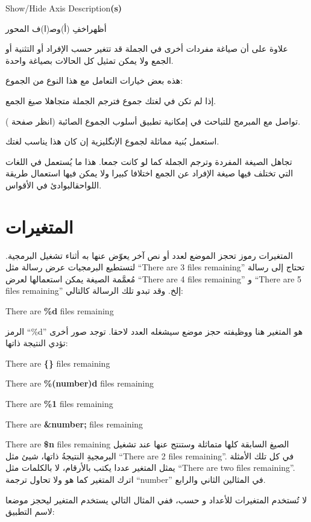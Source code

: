 Show/Hide Axis Description{\bf (s)}

أظهر اخفِ (أ)وص‍(ا)ف المحور

علاوة على أن صياغة مفردات أخرى في الجملة قد تتغير حسب الإفراد أو التثنية
أو الجمع ولا يمكن تمثيل كل الحالات بصياغة واحدة.

هذه بعض خيارات التعامل مع هذا النوع من الجموع:

\startitemize[n]
\item إذا لم تكن في لغتك جموع فترجم الجملة متجاهلا صيغ الجمع.
\item تواصل مع المبرمج للتباحث في إمكانية تطبيق أسلوب الجموع الصائبة
(انظر صفحة \at[ref:33482409]).
\item استعمل بُنية مماثلة لجموع الإنگليزية إن كان هذا يناسب لغتك.
\item تجاهل الصيغة المفردة وترجم الجملة كما لو كانت جمعا. هذا ما يُستعمل
في اللغات التي تختلف فيها صيغة الإفراد عن الجمع اختلافا كبيرا ولا يمكن
فيها استعمال طريقة اللواحق البوادئ في الأقواس.
\stopitemize
\section[ref:33556809]{المتغيرات}
المتغيرات رموز تحجز الموضع لعدد أو
نص آخر يعوّض عنها به أثناء تشغيل البرمجية. لتستطيع البرمجيات عرض رسالة
مثل “There are 3 files remaining” تحتاج إلى رسالة مُعمَّمة الصيغة يمكن
استعمالها لعرض “There are 4 files remaining” و “There are 5 files
remaining” إلخ. وقد تبدو تلك الرسالة كالتالي:

There are {\bf \%d} files remaining

الرمز ‪“\%d”‬ هو المتغير هنا ووظيفته حجز موضع سيشغله العدد لاحقا. توجد
صور أخرى تؤدي النتيجة ذاتها:

\startitemize[1]
\item There are {\bf \{\}} files remaining
\item There are {\bf \%(number)d} files remaining
\item There are {\bf \%1} files remaining
\item There are {\bf \&number;} files remaining
\item There are {\bf \$n} files remaining
\stopitemize
الصيغ السابقة كلها متماثلة وستنتج عنها عند تشغيل البرمجيةِ النتيجةُ
ذاتها، شيئ مثل “There are 2 files remaining”. في كل تلك الأمثلة يمثل
المتغير عددا يكتب بالأرقام، لا بالكلمات مثل “There are two files
remaining”. اترك المتغير كما هو ولا تحاول ترجمة “number” في المثالين
الثاني والرابع.

لا تُستخدم المتغيرات للأعداد و حسب، ففي المثال التالي يستخدم المتغير
ليحجز موضعا لاسم التطبيق:


